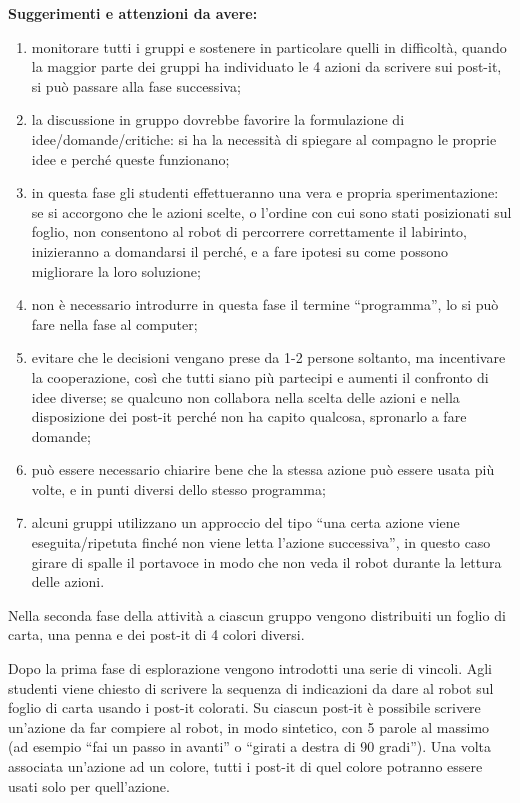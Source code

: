 \documentclass[12pt]{article}
\begin{document}
\textbf{Suggerimenti e attenzioni da avere:}
\begin{enumerate}
\item monitorare tutti i gruppi e sostenere in particolare quelli in difficoltà, quando la maggior parte dei gruppi ha individuato le 4 azioni da scrivere sui post-it, si può passare alla fase successiva;
\item la discussione in gruppo dovrebbe favorire la formulazione di idee/domande/critiche: si ha la necessità di spiegare al compagno le proprie idee e perché queste funzionano;
\item in questa fase gli studenti effettueranno una vera e propria sperimentazione: se si accorgono che le azioni scelte, o l’ordine con cui sono stati posizionati sul foglio, non consentono al robot di percorrere correttamente il labirinto, inizieranno a domandarsi il perché, e a fare ipotesi su come possono migliorare la loro soluzione;
\item non è necessario introdurre in questa fase il termine “programma”, lo si può fare nella fase al computer;
\item evitare che le decisioni vengano prese da 1-2 persone soltanto, ma incentivare la cooperazione, così che tutti siano più partecipi e aumenti il confronto di idee diverse; se qualcuno non collabora nella scelta delle azioni e nella disposizione dei post-it perché non ha capito qualcosa, spronarlo a fare domande;
\item può essere necessario chiarire bene che la stessa azione può essere usata più volte, e in punti diversi dello stesso programma;
\item alcuni gruppi utilizzano un approccio del tipo ``una certa azione viene eseguita/ripetuta finché non viene letta l'azione successiva'', in questo caso girare di spalle il portavoce in modo che non veda il robot durante la lettura delle azioni.
\end{enumerate}

Nella seconda fase della attività a ciascun gruppo vengono distribuiti un foglio di carta, una penna e dei post-it di 4 colori diversi.

Dopo la prima fase di esplorazione vengono introdotti una serie di vincoli. Agli studenti viene chiesto di scrivere la sequenza di indicazioni da dare al robot sul foglio di carta usando i post-it colorati. Su ciascun post-it è possibile scrivere un’azione da far compiere al robot, in modo sintetico, con 5 parole al massimo (ad esempio ``fai un passo in avanti” o ``girati a destra di 90 gradi”). Una volta associata un’azione ad un colore, tutti  i post-it di quel colore potranno essere usati solo
per quell’azione.
\end{document}
